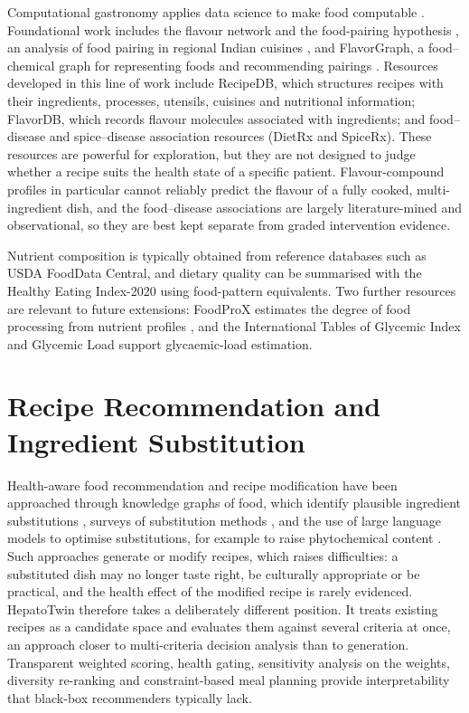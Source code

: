 Computational gastronomy applies data science to make food computable \cite{bagler2024}. Foundational work includes the flavour network and the food-pairing hypothesis \cite{ahn2011}, an analysis of food pairing in regional Indian cuisines \cite{jain2015}, and FlavorGraph, a food--chemical graph for representing foods and recommending pairings \cite{park2021}. Resources developed in this line of work include RecipeDB, which structures recipes with their ingredients, processes, utensils, cuisines and nutritional information; FlavorDB, which records flavour molecules associated with ingredients; and food--disease and spice--disease association resources (DietRx and SpiceRx). These resources are powerful for exploration, but they are not designed to judge whether a recipe suits the health state of a specific patient. Flavour-compound profiles in particular cannot reliably predict the flavour of a fully cooked, multi-ingredient dish, and the food--disease associations are largely literature-mined and observational, so they are best kept separate from graded intervention evidence.

Nutrient composition is typically obtained from reference databases such as USDA FoodData Central, and dietary quality can be summarised with the Healthy Eating Index-2020 \cite{shamswhite2023} using food-pattern equivalents. Two further resources are relevant to future extensions: FoodProX estimates the degree of food processing from nutrient profiles \cite{menichetti2023}, and the International Tables of Glycemic Index and Glycemic Load \cite{atkinson2021} support glycaemic-load estimation.

\section{Recipe Recommendation and Ingredient Substitution}
\label{sec:lr-reco}

Health-aware food recommendation and recipe modification have been approached through knowledge graphs of food, which identify plausible ingredient substitutions \cite{kgsubstitution2021}, surveys of substitution methods \cite{subsurvey2025}, and the use of large language models to optimise substitutions, for example to raise phytochemical content \cite{emerson2024}. Such approaches generate or modify recipes, which raises difficulties: a substituted dish may no longer taste right, be culturally appropriate or be practical, and the health effect of the modified recipe is rarely evidenced. HepatoTwin therefore takes a deliberately different position. It treats existing recipes as a candidate space and evaluates them against several criteria at once, an approach closer to multi-criteria decision analysis than to generation. Transparent weighted scoring, health gating, sensitivity analysis on the weights, diversity re-ranking and constraint-based meal planning provide interpretability that black-box recommenders typically lack.

